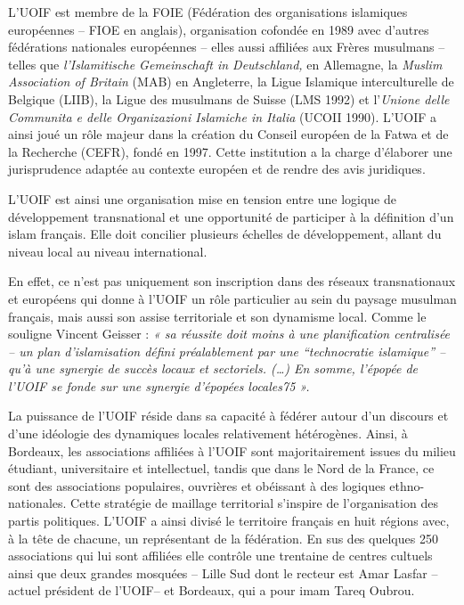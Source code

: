 L'UOIF est membre de la FOIE (Fédération des organisations islamiques
européennes -- FIOE en anglais), organisation cofondée en 1989 avec
d'autres fédérations nationales européennes -- elles aussi affiliées aux
Frères musulmans -- telles que \emph{l'Islamitische Gemeinschaft in
Deutschland,} en Allemagne, la \emph{Muslim Association of Britain}
(MAB) en Angleterre, la Ligue Islamique interculturelle de Belgique
(LIIB), la Ligue des musulmans de Suisse (LMS 1992) et l'\emph{Unione
delle Communita e delle Organizazioni Islamiche in Italia} (UCOII 1990).
L'UOIF a ainsi joué un rôle majeur dans la création du Conseil européen
de la Fatwa et de la Recherche (CEFR), fondé en 1997. Cette institution
a la charge d'élaborer une jurisprudence adaptée au contexte européen et
de rendre des avis juridiques.

L'UOIF est ainsi une organisation mise en tension entre une logique de
développement transnational et une opportunité de participer à la
définition d'un islam français. Elle doit concilier plusieurs échelles
de développement, allant du niveau local au niveau international.

En effet, ce n'est pas uniquement son inscription dans des réseaux
transnationaux et européens qui donne à l'UOIF un rôle particulier au
sein du paysage musulman français, mais aussi son assise territoriale et
son dynamisme local. Comme le souligne Vincent Geisser : \emph{« sa
réussite doit moins à une planification centralisée -- un plan
d'islamisation défini préalablement par une ``technocratie islamique''
-- qu'à une synergie de succès locaux et sectoriels. (\ldots) En somme,
l'épopée de l'UOIF se fonde sur une synergie d'épopées locales75 ».}

La puissance de l'UOIF réside dans sa capacité à fédérer autour d'un
discours et d'une idéologie des dynamiques locales relativement
hétérogènes. Ainsi, à Bordeaux, les associations affiliées à l'UOIF sont
majoritairement issues du milieu étudiant, universitaire et
intellectuel, tandis que dans le Nord de la France, ce sont des
associations populaires, ouvrières et obéissant à des logiques
ethno-nationales. Cette stratégie de maillage territorial s'inspire de
l'organisation des partis politiques. L'UOIF a ainsi divisé le
territoire français en huit régions avec, à la tête de chacune, un
représentant de la fédération. En sus des quelques 250 associations qui
lui sont affiliées elle contrôle une trentaine de centres cultuels ainsi
que deux grandes mosquées -- Lille Sud dont le recteur est Amar Lasfar
-- actuel président de l'UOIF-- et Bordeaux, qui a pour imam Tareq
Oubrou.

